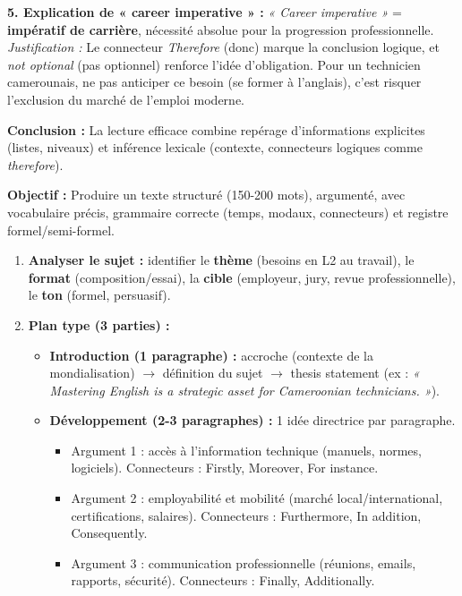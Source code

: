 \documentclass[11pt]{article}
\newcommand{\cle}[1]{{\popxbold\color{popdark}#1}}
\begin{document}
\begin{exoresolu}
\textbf{5. Explication de « career imperative » :}
\emph{« Career imperative »} = \textbf{impératif de carrière}, nécessité absolue pour la progression professionnelle.
\emph{Justification :} Le connecteur \emph{Therefore} (donc) marque la conclusion logique, et \emph{not optional} (pas optionnel) renforce l'idée d'obligation. Pour un technicien camerounais, ne pas anticiper ce besoin (se former à l'anglais), c'est risquer l'exclusion du marché de l'emploi moderne.

\textbf{Conclusion :} La lecture efficace combine repérage d'informations explicites (listes, niveaux) et inférence lexicale (contexte, connecteurs logiques comme \emph{therefore}).
\end{exoresolu}

\begin{methode}
\textbf{Objectif :} Produire un texte structuré (150-200 mots), argumenté, avec vocabulaire précis, grammaire correcte (temps, modaux, connecteurs) et registre formel/semi-formel.
\begin{enumerate}
    \item \textbf{Analyser le sujet :} identifier le \textbf{thème} (besoins en L2 au travail), le \textbf{format} (composition/essai), la \textbf{cible} (employeur, jury, revue professionnelle), le \textbf{ton} (formel, persuasif).
    \item \textbf{Plan type (3 parties) :}
    \begin{itemize}
        \item \textbf{Introduction (1 paragraphe) :} accroche (contexte de la mondialisation) $\rightarrow$ définition du sujet $\rightarrow$ \cle{thesis statement} (ex : \emph{« Mastering English is a strategic asset for Cameroonian technicians. »}).
        \item \textbf{Développement (2-3 paragraphes) :} 1 idée directrice par paragraphe.
            \begin{itemize}
                \item \cle{Argument 1 : accès à l'information technique} (manuels, normes, logiciels). Connecteurs : \cle{Firstly, Moreover, For instance}.
                \item \cle{Argument 2 : employabilité et mobilité} (marché local/international, certifications, salaires). Connecteurs : \cle{Furthermore, In addition, Consequently}.
                \item \cle{Argument 3 : communication professionnelle} (réunions, emails, rapports, sécurité). Connecteurs : \cle{Finally, Additionally}.

\end{itemize}
\end{itemize}
\end{enumerate}
\end{methode}
\end{document}
